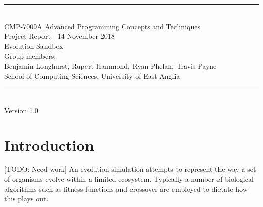 \documentclass[a4paper, oneside, 11pt]{report}
\begin{document}
\begin{titlepage}
\begin{center}
\rule{12cm}{1mm} \\
\vspace{1cm}
{\large  CMP-7009A Advanced Programming Concepts and Techniques}
\vspace{7.5cm}
\\{\Large Project Report - 14 November 2018}
\vspace{1.5cm}
\\{\LARGE Evolution Sandbox}
\vspace{1.0cm}
\\{\Large Group members: \\ Benjamin Longhurst, Rupert Hammond, Ryan Phelan, Travis Payne}
\vspace{10.0cm}
\\{\large School of Computing Sciences, University of East Anglia}
\\ \rule{12cm}{0.5mm}
\\ \hspace{8.5cm} {\large Version 1.0}
\end{center}
\end{titlepage}

\setcounter{page}{1}

\chapter{Introduction}
[TODO: Need work]
An evolution simulation attempts to represent the way a set of organisms evolve within a limited ecosystem. Typically a number of biological algorithms such as fitness functions and crossover are employed to dictate how this plays out. 
\end{document}
